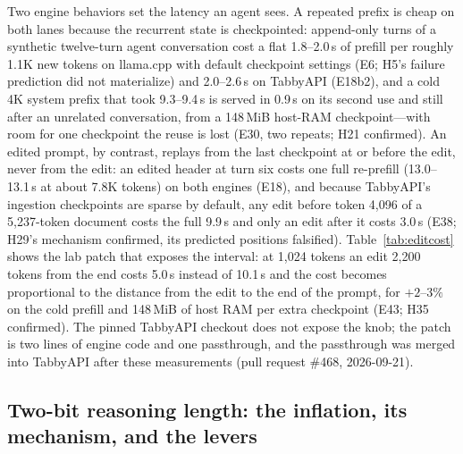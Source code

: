 \documentclass[11pt]{article}
\begin{document}
Two engine behaviors set the latency an agent sees. A repeated prefix is
cheap on both lanes because the recurrent state is checkpointed: append-only
turns of a synthetic twelve-turn agent conversation cost a flat 1.8--2.0\,s of
prefill per roughly 1.1K new tokens on llama.cpp with default checkpoint
settings (E6; H5's failure prediction did not materialize) and 2.0--2.6\,s on
TabbyAPI (E18b2), and a cold 4K system prefix that took 9.3--9.4\,s is served
in 0.9\,s on its second use and still after an unrelated conversation, from a
148\,MiB host-RAM checkpoint---with room for one checkpoint the reuse is lost
(E30, two repeats; H21 confirmed). An edited prompt, by contrast, replays from
the last checkpoint at or before the edit, never from the edit: an edited
header at turn six costs one full re-prefill (13.0--13.1\,s at about 7.8K
tokens) on both engines (E18), and because TabbyAPI's ingestion checkpoints
are sparse by default, any edit before token 4,096 of a 5,237-token document
costs the full 9.9\,s and only an edit after it costs 3.0\,s (E38; H29's
mechanism confirmed, its predicted positions falsified).
Table~\ref{tab:editcost} shows the lab patch that exposes the interval: at
1,024 tokens an edit 2,200 tokens from the end costs 5.0\,s instead of
10.1\,s and the cost becomes proportional to the distance from the edit to
the end of the prompt, for $+2$--$3\%$ on the cold prefill and 148\,MiB of
host RAM per extra checkpoint (E43; H35 confirmed). The pinned TabbyAPI
checkout does not expose the knob; the patch is two lines of engine code and
one passthrough, and the passthrough was merged into TabbyAPI after these
measurements (pull request \#468, 2026-09-21).

\subsection{Two-bit reasoning length: the inflation, its mechanism, and the levers}
\label{sec:inflation}
\end{document}
